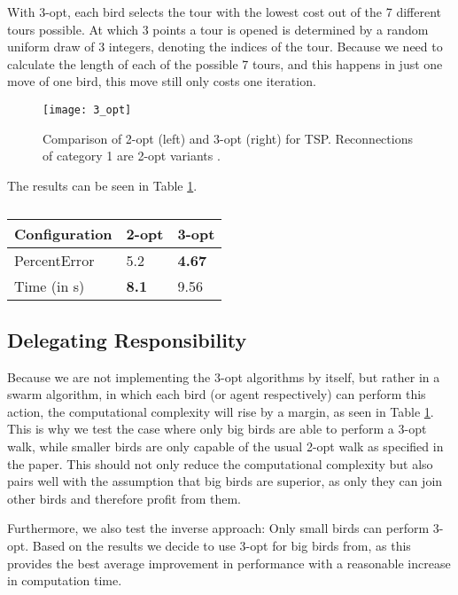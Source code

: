 With 3-opt, each bird selects the tour with the lowest cost out of the 7 different tours possible. At which 3 points a tour is opened is determined by a random uniform draw of 3 integers, denoting the indices of the tour. Because we need to calculate the length of each of the possible 7 tours, and this happens in just one move of one bird, this move still only costs one iteration.

\begin{figure}[htbp]
\centerline{\texttt{[image: 3\_opt]}}
\caption{Comparison of 2-opt (left) and 3-opt (right) for TSP. Reconnections of category 1 are 2-opt variants \cite{3_opt}.}
\label{3_opt}
\end{figure}

The results can be seen in Table \ref{3_opt_performance}.

\begin{table}[h!]
\centering
\begin{tabular}{ |p{2cm}||p{0.75cm}|p{0.75cm}|  }
 \hline
 Configuration& 2-opt & 3-opt\\
 \hline \hline
PercentError & 5.2 & \textbf{4.67}\\
 \hline
 Time (in s) & \textbf{8.1} & 9.56\\
 \hline
\end{tabular}
\caption{}
\label{3_opt_performance}
\end{table}

\subsection{Delegating Responsibility}

Because we are not implementing the 3-opt algorithms by itself, but rather in a swarm algorithm, in which each bird (or agent respectively) can perform this action, the computational complexity will rise by a margin, as seen in Table \ref{3_opt_performance}. This is why we test the case where only big birds are able to perform a 3-opt walk, while smaller birds are only capable of the usual 2-opt walk as specified in the paper. This should not only reduce the computational complexity but also pairs well with the assumption that big birds are superior, as only they can join other birds and therefore profit from them.

Furthermore, we also test the inverse approach: Only small birds can perform 3-opt.
Based on the results we decide to use 3-opt for big birds from, as this provides the best average improvement in performance with a reasonable increase in computation time.


